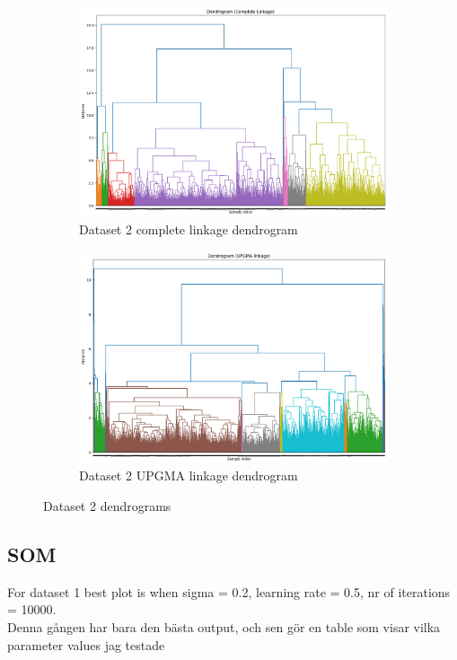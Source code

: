 \documentclass[12pt]{report}
\begin{document}
	\begin{figure}[H]
		\centering
		\begin{subfigure}{.5\textwidth}
			\centering
			\includegraphics[width=.9\linewidth]{../AHC/Dendrograms/Dataset2/completeLinkage.png}
			\caption{Dataset 2 complete linkage dendrogram}
			\label{Dataset2completeLinkage}
		\end{subfigure}%
		\begin{subfigure}{.5\textwidth}
			\centering
			\includegraphics[width=.9\linewidth]{../AHC/Dendrograms/Dataset2/UPGMA_linkage.png}
			\caption{Dataset 2 UPGMA linkage dendrogram}
			\label{Dataset2UPGMA}
		\end{subfigure}
		\caption{Dataset 2 dendrograms}
		\label{Dataset2Dendrograms}
	\end{figure}

	\newpage
	\subsection*{SOM}	
	For dataset 1 best plot is when sigma = 0.2, learning rate = 0.5, nr of iterations = 10000.\\
	Denna gången har bara den bästa output, och sen gör en table som visar vilka parameter values jag testade
\end{document}
